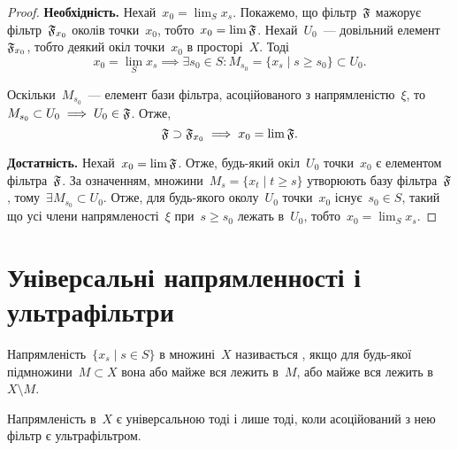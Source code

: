 \begin{proof}
    \textbf{Необхідність.} Нехай~$x_0 = \lim_S x_s$. Покажемо, що фільтр~$\frak F$ мажорує фільтр~$\frak F_{x_0}$ околів точки~$x_0$, тобто~$x_0 = \lim \frak F$. Нехай~$U_0$~--- довільний елемент~$\frak F_{x_0}$, тобто деякий окіл точки~$x_0$ в просторі~$X$. Тоді
    \begin{equation*}
        x_0 = \lim_S x_s \implies
        \exists s_0 \in S: M_{s_0} = \{ x_s \mid s \ge s_0 \} \subset U_0.
    \end{equation*}

    Оскільки~$M_{s_0}$~--- елемент бази фільтра, асоційованого з напрямленістю~$\xi$, то~$M_{s_0} \subset U_0 \implies U_0 \in \frak F$. Отже, 
    \begin{equation*}
        \frak F \supset \frak F_{x_0} \implies x_0 = \lim \frak F.
    \end{equation*}

    \textbf{Достатність.} Нехай~$x_0 = \lim \frak F$. Отже, будь-який окіл~$U_0$ точки~$x_0$ є елементом фільтра~$\frak F$. За означенням, множини~$M_s = \{x_t \mid t \ge s\}$ утворюють базу фільтра~$\frak F$, тому~$\exists M_{s_0} \subset U_0$. Отже, для будь-якого околу~$U_0$ точки~$x_0$ існує~$s_0 \in S$, такий що усі члени напрямленості~$\xi$ при~$s \ge s_0$ лежать в~$U_0$, тобто~$x_0 = \lim_S x_s$.
\end{proof}

\section{Універсальні напрямленності і ультрафільтри}

\begin{definition}
    Напрямленість~$\{x_s \mid s\in S\}$ в множині~$X$ називається , якщо для будь-якої підмножини~$M \subset X$ вона або майже вся лежить в~$M$, або майже вся лежить в~$X \setminus M$.
\end{definition}

\begin{theorem}
    \label{th:universal-net-is-ultrafilter}
    Напрямленість в~$X$ є універсальною тоді і лише тоді, коли асоційований з нею фільтр є ультрафільтром.
\end{theorem}

